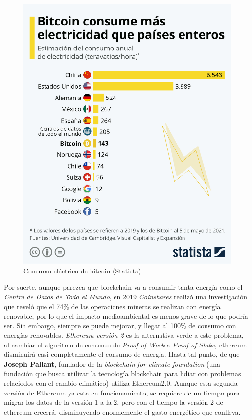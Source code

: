 \begin{figure}[h!]
  \centering
  \includegraphics[width=0.8\linewidth]{figs/ImpactoMedioAmbiente/electricidad_bitcoin}
  \caption[Consumo eléctrico de bitcoin]{Consumo eléctrico de bitcoin (\href{https://es.statista.com/grafico/18630/consumo-de-electricidad-anual-de-bitcoin/}{Statista})}
  \label{fig:electricidad_bitcoin}
\end{figure}

Por suerte, aunque parezca que blockchain va a consumir tanta energía como el \textit{Centro de Datos de Todo el Mundo}, en 2019 \emph{Coinshares} realizó una investigación\cite{coinshare} que reveló que el 74\% de las operaciones mineras se realizan con energía renovable, por lo que el impacto medioambiental es menos grave de lo que podría ser. Sin embargo, siempre se puede mejorar, y llegar al 100\% de consumo con energías renovables. \emph{Ethereum versión 2}\cite{Ethereum2.0} es la alternativa verde a este problema, al cambiar el algoritmo de consenso de \textit{Proof of Work} a \textit{Proof of Stake}, ethereum disminuirá casi completamente el consumo de energía. Hasta tal punto, de que \textbf{Joseph Pallant}, fundador de la \emph{blockchain for climate foundation}\cite{bkClimateF} (una fundación que busca utilizar la tecnología blockchain para lidiar con problemas relaciodos con el cambio climático) utiliza Ethereum2.0. Aunque esta segunda versión de Ethereum ya esta en funcionamiento, se requiere de un tiempo para migrar los datos de la versión 1 a la 2, pero con el tiempo la versión 2 de ethereum crecerá, disminuyendo enormemente el gasto energético que conlleva. \\

